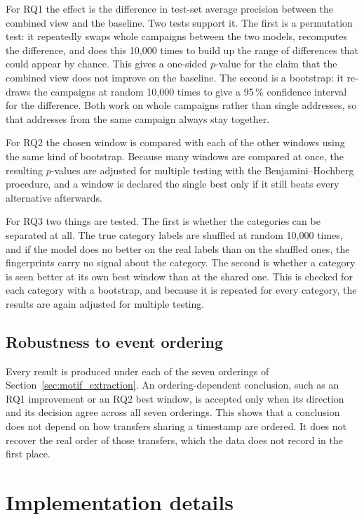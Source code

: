 \documentclass{thesisclass}
\begin{document}
For RQ1 the effect is the difference in test-set average precision between the
combined view and the baseline. Two tests support it. The first is a permutation
test: it repeatedly swaps whole campaigns between the two models, recomputes the
difference, and does this 10{,}000 times to build up the range of differences that
could appear by chance. This gives a one-sided $p$-value for the claim that the
combined view does not improve on the baseline. The second is a bootstrap: it
re-draws the campaigns at random 10{,}000 times to give a 95\,\% confidence
interval for the difference. Both work on whole campaigns rather than single
addresses, so that addresses from the same campaign always stay together.

For RQ2 the chosen window is compared with each of the other windows using the
same kind of bootstrap. Because many windows are compared at once, the resulting
$p$-values are adjusted for multiple testing with the Benjamini--Hochberg
procedure, and a window is declared the single best only if it still beats every
alternative afterwards.

For RQ3 two things are tested. The first is whether the categories can be separated
at all. The true category labels are shuffled at random 10{,}000 times, and if the
model does no better on the real labels than on the shuffled ones, the fingerprints
carry no signal about the category. The second is whether a category is seen better
at its own best window than at the shared one. This is checked for each category
with a bootstrap, and because it is repeated for every category, the results are
again adjusted for multiple testing.

\subsection{Robustness to event ordering}

Every result is produced under each of the seven orderings of
Section~\ref{sec:motif_extraction}. An ordering-dependent conclusion, such as an
RQ1 improvement or an RQ2 best window, is accepted only when its direction and its
decision agree across all seven orderings. This shows that a conclusion does not
depend on how transfers sharing a timestamp are ordered. It does not recover the
real order of those transfers, which the data does not record in the first place.

\section{Implementation details}
\label{sec:implementation}
\end{document}
